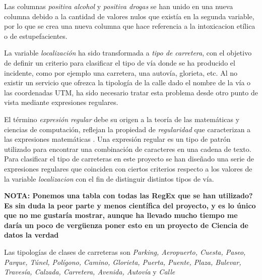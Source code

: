 \begin{enumerate}
                    Las columnas \textit{positiva alcohol} y \textit{positiva drogas} se han unido en una nueva columna debido a la cantidad de valores nulos que existía en la segunda variable, por lo que se crea una nueva columna que hace referencia a la intoxicacion etílica o de estupefacientes.
  

                    La variable \textit{localización} ha sido transformada a \textit{tipo de carretera}, con el objetivo de definir un criterio para clasificar el tipo de vía donde se ha producido el incidente, como por ejemplo una carretera, una autovía, glorieta, etc. Al no existir un servicio que ofrezca la tipología de la calle dado el nombre de la vía o las coordenadas UTM, ha sido necesario tratar esta problema desde otro punto de vista mediante expresiones regulares.

                    El término \textit{expresión regular} debe su origen a la teoría de las matemáticas y ciencias de computación, reflejan la propiedad de \textit{regularidad} que caracterizan a las expresiones matemáticas \cite{RegeXBook}. Una expresión regular es un tipo de patrón utilizado para encontrar una combinación de caracteres en una cadena de texto. Para clasificar el tipo de carreteras en este proyecto se han diseñado una serie de expresiones regulares que coinciden con ciertos criterios respecto a los valores de la variable \textit{localizacion} con el fin de distinguir distintos tipos de vía.


                    \textbf{NOTA: Ponemos una tabla con todas las RegEx que se han utilizado? Es sin duda la peor parte y menos científica del proyecto, y es lo único que no me gustaría mostrar, aunque ha llevado mucho tiempo me daría un poco de vergüenza poner esto en un proyecto de Ciencia de datos la verdad}


                    Las tipologías de clases de carreteras son \textit{Parking, Aeropuerto, Cuesta, Paseo, Parque, Túnel, Polígono, Camino, Glorieta, Puerta, Puente, Plaza, Bulevar, Travesía, Calzada, Carretera, Avenida, Autovía} y \textit{Calle}



\end{enumerate}
